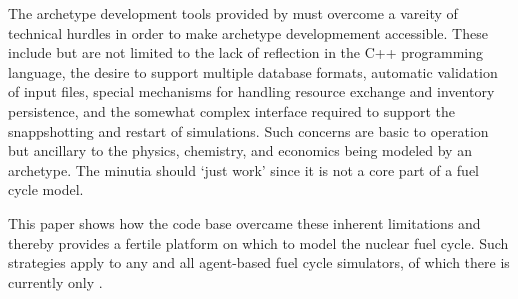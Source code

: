 The archetype development tools provided by \cyclus must overcome a vareity of 
technical hurdles in order to make archetype developmement accessible.  These 
include but are not limited to the lack of reflection in the C++ programming language, 
the desire to support multiple database formats, automatic validation of input files,
special mechanisms for handling resource exchange and inventory persistence, 
and the somewhat complex interface required to support the snappshotting and 
restart of simulations. Such concerns are basic to \cyclus operation but 
ancillary to the physics, chemistry, and economics being modeled by an archetype.
The minutia should `just work' since it is not a core part of a fuel cycle model.

This paper shows how the \cyclus code base overcame these inherent limitations
and thereby provides a fertile platform on which to model the nuclear fuel cycle.
Such strategies apply to any and all agent-based fuel cycle simulators, of which 
there is currently only \cyclus.
